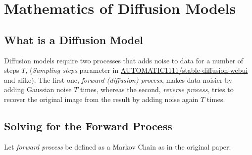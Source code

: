 \documentclass{article}
\numberwithin{equation}{subsection}
\begin{document}
\section{Mathematics of Diffusion Models}
\subsection{What is a Diffusion Model}

Diffusion models require two processes that adds noise to data for a number of steps $T$, (\textit{Sampling steps} parameter in \href{https://github.com/AUTOMATIC1111/stable-diffusion-webui}{AUTOMATIC1111/stable-diffusion-webui} and alike). The first one, \textit{forward (diffusion) process}, makes data noisier by adding Gaussian noise $T$ times, whereas the second, \textit{reverse process}, tries to recover the original image from the result by adding noise again $T$ times. 
\subsection{Solving for the Forward Process}
Let \textit{forward process} be defined as a Markov Chain as in the original paper:
\end{document}
